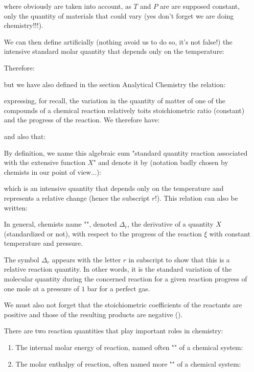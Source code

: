 	where obviously are taken into account, as $T$ and $P$ are are supposed constant, only the quantity of materials that could vary (yes don't forget we are doing chemistry!!!).

	We can then define artificially (nothing avoid us to do so, it's not false!) the intensive standard molar quantity that depends only on the temperature:
	
	Therefore:
	
	but we have also defined in the section Analytical Chemistry the relation:
	
	expressing, for recall, the variation in the quantity of matter of one of the compounds of a chemical reaction relatively toits stoichiometric ratio (constant) and the progress of the reaction. We therefore have:
	
	and also that:
	
	By definition, we name this algebraic sum "standard quantity reaction associated with the extensive function $X$" and denote it by (notation badly chosen by chemists in our point of view...):
	
	which is an intensive quantity that depends only on the temperature and represents a relative change (hence the subscript $r$!). This relation can also be written:
	
	In general, chemists name "", denoted $\Delta_r$, the derivative of a quantity $X$ (standardized or not), with respect to the progress of the reaction $\xi$ with constant temperature and pressure.
	\begin{tcolorbox}[title=Remark,colframe=black,arc=10pt]
	The symbol $\Delta_r$ appears with the letter $r$ in subscript to show that this is a relative reaction quantity. In other words, it is the standard variation of the molecular quantity during the concerned reaction for a given reaction progress of one mole at a pressure of $1$ bar for a perfect gas.
	\end{tcolorbox}
	We must also not forget that the stoichiometric coefficients of the reactants are positive and those of the resulting products are negative ().

	There are two reaction quantities that play important roles in chemistry:
	\begin{enumerate}
		\item The internal molar energy of reaction, named often "" of a chemical system:
		

		\item The molar enthalpy of reaction, often named more "" of a chemical system:
		
	\end{enumerate}
	
